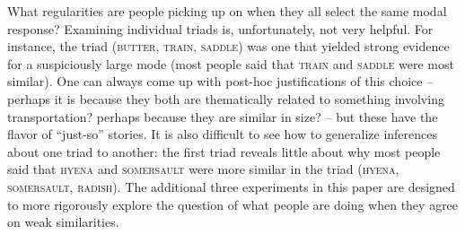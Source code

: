\documentclass[doc]{apa6}
\newcommand{\stimulus}[1]{\textsc{#1}}
\begin{document}
What regularities are people picking up on when they all select the same modal response? Examining individual triads is, unfortunately, not very helpful. For instance, the triad (\stimulus{butter}, \stimulus{train}, \stimulus{saddle}) was one that yielded strong evidence for a suspiciously large mode (most people said that \stimulus{train} and \stimulus{saddle} were most similar). One can always come up with post-hoc justifications of this choice -- perhaps it is because they both are thematically related to something involving transportation? perhaps because they are similar in size? -- but these have the flavor of ``just-so'' stories. It is also difficult to see how to generalize inferences about one triad to another: the first triad reveals little about why most people said that \stimulus{hyena} and \stimulus{somersault} were more similar in the triad (\stimulus{hyena}, \stimulus{somersault}, \stimulus{radish}). The additional three experiments in this paper are designed to more rigorously explore the question of what people are doing when they agree on weak similarities.
\end{document}
